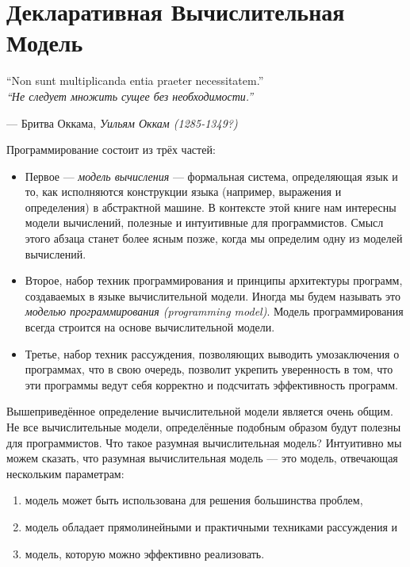 \chapter{Декларативная Вычислительная Модель}\label{chapter_2}

\epigraph{``Non sunt multiplicanda entia praeter necessitatem.'' \\ \emph{``Не следует множить сущее без необходимости.''}}{--- Бритва Оккама, \emph{Уильям Оккам (1285-1349?)}}

Программирование состоит из трёх частей:

\begin{itemize}
\item{Первое --- \emph{модель вычисления} --- формальная система, определяющая язык и то, как исполняются конструкции языка (например, выражения и определения) в абстрактной машине. В контексте этой книге нам интересны модели вычислений, полезные и интуитивные для программистов. Смысл этого абзаца станет более ясным позже, когда мы определим одну из моделей вычислений.}

\item{Второе, набор техник программирования и принципы архитектуры программ, создаваемых в языке вычислительной модели. Иногда мы будем называть это \emph{моделью программирования (programming model)}. Модель программирования всегда строится на основе вычислительной модели.}

\item{Третье, набор техник рассуждения, позволяющих выводить умозаключения о программах, что в свою очередь, позволит укрепить уверенность в том, что эти программы ведут себя корректно и подсчитать эффективность программ.}
\end{itemize}

Вышеприведённое определение вычислительной модели является очень общим. Не все вычислительные модели, определённые подобным образом будут полезны для программистов. Что такое разумная вычислительная модель? Интуитивно мы можем сказать, что разумная вычислительная модель --- это модель, отвечающая нескольким параметрам:

\begin{enumerate}
\item{модель может быть использована для решения большинства проблем,}
\item{модель обладает прямолинейными и практичными техниками рассуждения и}
\item{модель, которую можно эффективно реализовать.}
\end{enumerate}

